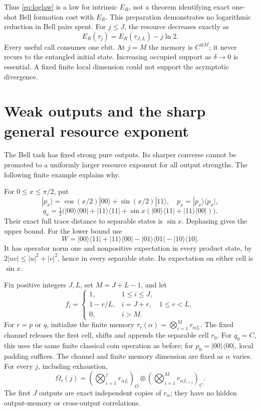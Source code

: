 \documentclass[11pt,a4paper]{article}
\numberwithin{equation}{section}
\theoremstyle{remark}
\newcommand{\ER}{E_R}
\newcommand{\ket}[1]{|#1\rangle}
\newcommand{\bra}[1]{\langle#1|}
\newcommand{\proj}[1]{|#1\rangle\langle#1|}
\begin{document}
Thus \eqref{eq:loglaw} is a law for intrinsic \(\ER\), not a theorem
identifying exact one-shot Bell formation cost with \(\ER\). This
preparation demonstrates no logarithmic reduction in Bell pairs spent.
For \(j\leq J\), the resource decreases exactly as
\[
 \ER(\tau_j)=\ER(\tau_{J,L})-j\ln2.
\]
Every useful call consumes one ebit. At \(j=M\) the memory is \(C^{\otimes M}\);
it never recurs to the entangled initial state. Increasing occupied support
as \(\delta\to0\) is essential. A fixed finite local dimension could not
support the asymptotic divergence.

\section{Weak outputs and the sharp general resource exponent}
\label{sec:graded}
The Bell task has fixed strong pure outputs. Its sharper converse cannot
be promoted to a uniformly larger resource exponent for all output strengths.
The following finite example explains why.

For \(0\leq x\leq\pi/2\), put
\[
 \ket{p_x}=\cos(x/2)\ket{00}+\sin(x/2)\ket{11},\quad
 p_x=\proj{p_x},
\]
\[
 q_x=\tfrac12\bigl(\proj{00}+\proj{11}
   +\sin x(\ket{00}\bra{11}+\ket{11}\bra{00})\bigr).
\]
Their exact full trace distance to separable states is \(\sin x\).
Dephasing gives the upper bound. For the lower bound use
\[
 W=\ket{00}\bra{11}+\ket{11}\bra{00}
                -\proj{01}-\proj{10}.
\]
It has operator norm one and nonpositive expectation in every product
state, by \(2|uv|\leq|u|^2+|v|^2\), hence in every separable state.
Its expectation on either cell is \(\sin x\).

Fix positive integers \(J,L\), set \(M=J+L-1\), and let
\[
 f_i=
 \begin{cases}
 1,&1\leq i\leq J,\\
 1-r/L,&i=J+r,\quad1\leq r<L,\\
 0,&i>M.
 \end{cases}
\]
For \(r=p\) or \(q\), initialize the finite memory
\(\tau_r(\alpha)=\bigotimes_{i=1}^M r_{\alpha f_i}\).
The fixed channel releases the first cell, shifts and appends the separable
cell \(r_0\). For \(q_0=C\), this uses the same finite classical coin
operation as before; for \(p_0=\proj{00}\), local padding suffices.
The channel and finite memory dimension are fixed as \(\alpha\) varies.
For every \(j\), including exhaustion,
\begin{equation}
 \Omega_r(j)=
 \left(\bigotimes_{i=1}^j r_{\alpha f_i}\right)_O
 \otimes\left(\bigotimes_{i=1}^M r_{\alpha f_{i+j}}\right)_C.
                                                        \label{eq:graded-full}
\end{equation}
The first \(J\) outputs are exact independent copies of \(r_\alpha\);
they have no hidden output-memory or cross-output correlations.
\end{document}
